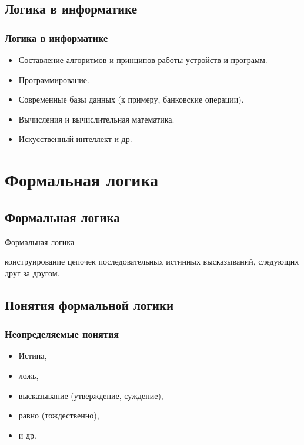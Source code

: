 \documentclass[compress,red]{beamer}
\begin{document}
\subsection{Логика в информатике}
\begin{frame}
  \frametitle{Логика в информатике}
  \begin{itemize}
    \item Составление алгоритмов и принципов работы устройств и программ.
    \item Программирование.
    \item Современные базы данных (к примеру, банковские операции).
    \item Вычисления и вычислительная математика.
    \item Искусственный интеллект и др.
  \end{itemize}
\end{frame}

\section{Формальная логика}
\subsection{Формальная логика}
\begin{frame}
  \begin{center}
    \Huge{Формальная логика}
  \end{center}
  \begin{center}
    \Large{конструирование цепочек последовательных истинных высказываний, следующих друг за другом.}
  \end{center}
\end{frame}

\subsection{Понятия формальной логики}
\begin{frame}[fragile]
  \frametitle{Неопределяемые понятия}
  \begin{itemize}
    \item Истина,
    \item ложь,
    \item высказывание (утверждение, суждение),
    \item равно (тождественно),
    \item и др.
  \end{itemize}
\end{frame}
\end{document}
